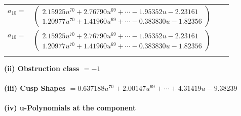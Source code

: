 \documentclass[1p]{elsarticle_modified}
\theoremstyle{definition}
\begin{document}
\begin{tabular}{m{7pt} m{180pt} m{7pt} m{180pt} }
\flushright $a_{10}=$&$\begin{pmatrix}2.15925 u^{70}+2.76790 u^{69}+\cdots-1.95352 u-2.23161\\1.20977 u^{70}+1.41960 u^{69}+\cdots-0.383830 u-1.82356\end{pmatrix}$\\ \flushright $a_{10}=$&$\begin{pmatrix}2.15925 u^{70}+2.76790 u^{69}+\cdots-1.95352 u-2.23161\\1.20977 u^{70}+1.41960 u^{69}+\cdots-0.383830 u-1.82356\end{pmatrix}$\\&\end{tabular}
\flushleft \textbf{(ii) Obstruction class $= -1$}\\~\\
\flushleft \textbf{(iii) Cusp Shapes $= 0.637188 u^{70}+2.00147 u^{69}+\cdots+4.31419 u-9.38239$}\\~\\
\newpage\renewcommand{\arraystretch}{1}
\flushleft \textbf{(iv) u-Polynomials at the component}\newline \\
\end{document}
